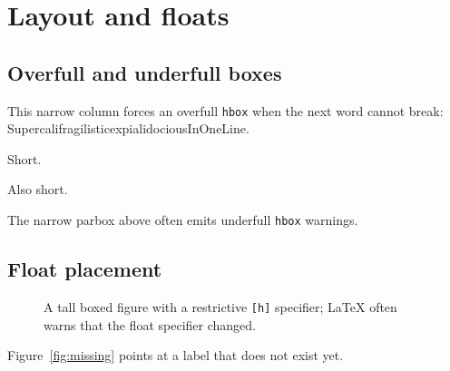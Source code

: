 \section{Layout and floats}\label{sec:layout}

\subsection{Overfull and underfull boxes}

{\hsize=4.5cm\relax
\noindent This narrow column forces an overfull \texttt{hbox} when the next word cannot
break: \mbox{SupercalifragilisticexpialidociousInOneLine}.\par}

{\textwidth\relax
\noindent Short.\par
\noindent Also short.\par
}
The narrow parbox above often emits underfull \texttt{hbox} warnings.

\subsection{Float placement}

\begin{figure}[h]
  \centering
  \caption{A tall boxed figure with a restrictive \texttt{[h]} specifier; LaTeX often warns
    that the float specifier changed.}
  \label{fig:demo}
\end{figure}

Figure~\ref{fig:missing} points at a label that does not exist yet.

